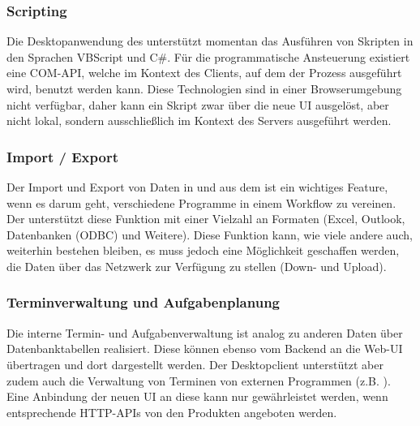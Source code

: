\subsubsection{Scripting}
Die Desktopanwendung des  unterstützt momentan das Ausführen von Skripten in den Sprachen VBScript und C\#. Für die programmatische Ansteuerung existiert eine \gls{COM}-API, welche im Kontext des Clients, auf dem der Prozess ausgeführt wird, benutzt werden kann. Diese Technologien sind in einer Browserumgebung nicht verfügbar, daher kann ein Skript zwar über die neue UI ausgelöst, aber nicht lokal, sondern ausschließlich im Kontext des Servers ausgeführt werden. 

\subsubsection{Import / Export}
Der Import und Export von Daten in und aus dem  ist ein wichtiges Feature, wenn es darum geht, verschiedene Programme in einem Workflow zu vereinen. Der  unterstützt diese Funktion mit einer Vielzahl an Formaten (Excel, Outlook, Datenbanken (ODBC) und Weitere). Diese Funktion kann, wie viele andere auch, weiterhin bestehen bleiben, es muss jedoch eine Möglichkeit geschaffen werden, die Daten über das Netzwerk zur Verfügung zu stellen (Down- und Upload).

\subsubsection{Terminverwaltung und Aufgabenplanung}
Die interne Termin- und Aufgabenverwaltung ist analog zu anderen Daten über Datenbanktabellen realisiert. Diese können ebenso vom Backend an die Web-UI übertragen und dort dargestellt werden. Der Desktopclient unterstützt aber zudem auch die Verwaltung von Terminen von externen Programmen (z.B. ). Eine Anbindung der neuen UI an diese kann nur gewährleistet werden, wenn entsprechende HTTP-APIs von den Produkten angeboten werden.

